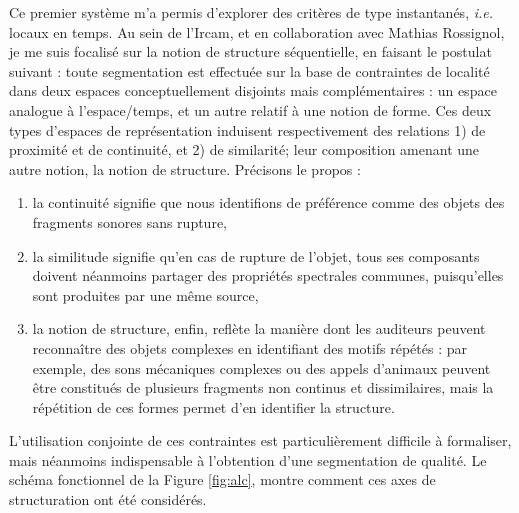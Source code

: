 


Ce premier système m'a permis d'explorer des critères de type instantanés, \textit{i.e.} locaux en temps. Au sein de l'Ircam, et en collaboration avec Mathias Rossignol, je me suis focalisé sur la notion de structure séquentielle, en faisant le postulat suivant : toute segmentation est effectuée sur la base de contraintes de localité dans deux espaces conceptuellement disjoints mais complémentaires : un espace analogue à l'espace/temps, et un autre relatif à une notion de forme. Ces deux types d'espaces de représentation induisent respectivement des relations 1) de proximité et de continuité, et 2) de similarité; leur composition amenant une autre notion, la notion de structure. Précisons le propos : %

\begin{enumerate}
\item la continuité signifie que nous identifions de préférence comme des objets des fragments sonores sans rupture,
\item la similitude signifie qu'en cas de rupture de l'objet, tous ses composants doivent néanmoins partager des propriétés spectrales communes, puisqu'elles sont produites par une même source,
\item la notion de  structure, enfin, reflète la manière dont les auditeurs peuvent reconnaître des objets complexes en identifiant des motifs répétés : par exemple, des sons mécaniques complexes ou des appels d'animaux peuvent être constitués de plusieurs fragments non continus et dissimilaires, mais la répétition de ces formes permet d'en identifier la structure.
\end{enumerate}

L'utilisation conjointe de ces contraintes est particulièrement difficile à formaliser, mais néanmoins indispensable à l'obtention d'une segmentation de qualité. Le schéma fonctionnel de la Figure \ref{fig:alc}, montre comment ces axes de structuration ont été considérés.

